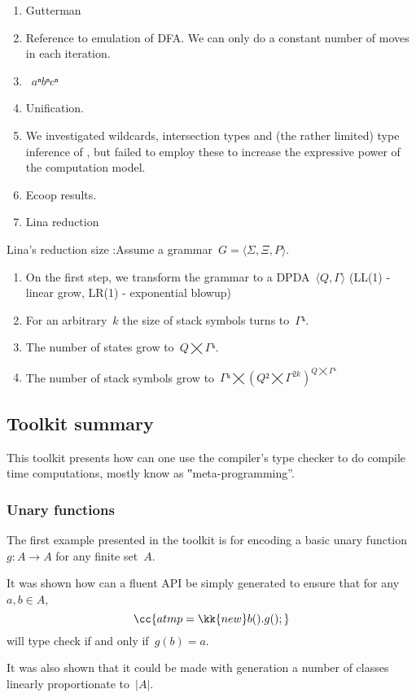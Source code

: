 
\begin{enumerate}
  \item Gutterman
  \item Reference to emulation of DFA\@. We can only do
        a constant number of moves in each iteration.
        \item~$aⁿbⁿcⁿ$
  \item \Prolog Unification.
  \item We investigated wildcards, intersection types and
        (the rather limited) type inference of
        \Java, but failed to employ these to increase the expressive power of
        the computation model.  
      \item Ecoop results.
  \item Lina reduction
\end{enumerate}

Lina's reduction size :Assume a grammar~$G=⟨Σ,Ξ,P⟩$.
\begin{enumerate}
  \item On the first step, we transform the grammar to a DPDA~$⟨Q,Γ⟩$ (LL(1) -
    linear grow, LR(1) - exponential blowup)
  \item For an arbitrary~$k$ the size of stack symbols turns to~$Γᵏ$.
  \item The number of states grow to~$Q⨉Γᵏ$.
  \item The number of stack symbols grow to~$Γᵏ⨉(Q²⨉Γ^{2k})^{Q⨉Γᵏ}$
\end{enumerate}

\subsection{Toolkit summary}
This toolkit presents how can one use the \Java compiler's
type checker to do compile time computations, mostly know as
‟meta-programming”.

\subsubsection*{Unary functions}
The first example presented in the toolkit is for encoding a
basic unary function~$g:A→A$ for any finite set~$A$.

It was shown how can a fluent API be simply generated
to ensure that for any~$a,b∈A$,
\[
  \cc{a tmp = \kk{new} b().g();}
\]
will type check if and only if~$g(b)=a$.

It was also shown that it could be made with generation
a number of classes linearly proportionate to~$|A|$.

